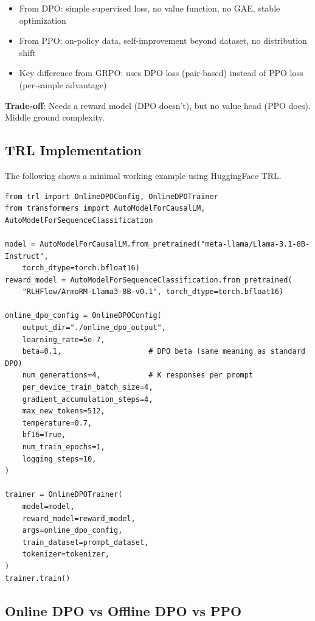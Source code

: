\begin{intuitionbox}[Online DPO = Best of Both Worlds]
\begin{itemize}
  \item From DPO: simple supervised loss, no value function, no GAE, stable optimization
  \item From PPO: on-policy data, self-improvement beyond dataset, no distribution shift
  \item Key difference from GRPO: uses DPO loss (pair-based) instead of PPO loss (per-sample advantage)
\end{itemize}

\textbf{Trade-off}: Needs a reward model (DPO doesn’t), but no value head (PPO does). Middle ground complexity.
\end{intuitionbox}


\subsection{TRL Implementation}
\label{trl-implementation}

The following shows a minimal working example using HuggingFace TRL.

\begin{lstlisting}[style=pythonstyle]
from trl import OnlineDPOConfig, OnlineDPOTrainer
from transformers import AutoModelForCausalLM, AutoModelForSequenceClassification

model = AutoModelForCausalLM.from_pretrained("meta-llama/Llama-3.1-8B-Instruct",
    torch_dtype=torch.bfloat16)
reward_model = AutoModelForSequenceClassification.from_pretrained(
    "RLHFlow/ArmoRM-Llama3-8B-v0.1", torch_dtype=torch.bfloat16)

online_dpo_config = OnlineDPOConfig(
    output_dir="./online_dpo_output",
    learning_rate=5e-7,
    beta=0.1,                    # DPO beta (same meaning as standard DPO)
    num_generations=4,           # K responses per prompt
    per_device_train_batch_size=4,
    gradient_accumulation_steps=4,
    max_new_tokens=512,
    temperature=0.7,
    bf16=True,
    num_train_epochs=1,
    logging_steps=10,
)

trainer = OnlineDPOTrainer(
    model=model,
    reward_model=reward_model,
    args=online_dpo_config,
    train_dataset=prompt_dataset,
    tokenizer=tokenizer,
)
trainer.train()
\end{lstlisting}

\subsection{Online DPO vs Offline DPO vs PPO}
\label{online-dpo-vs-offline-dpo-vs-ppo}

